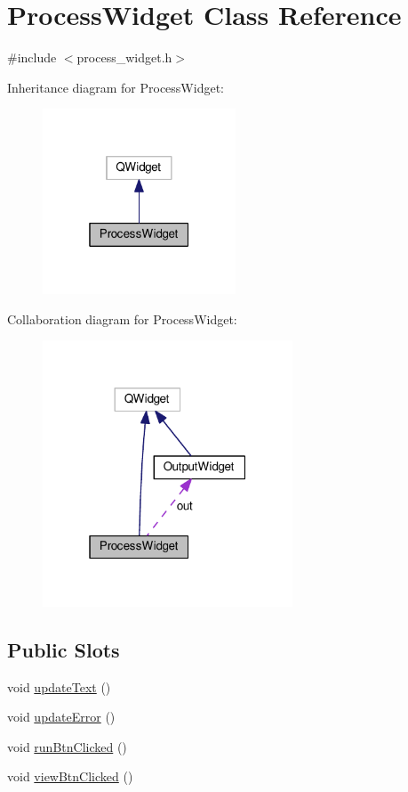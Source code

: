 \hypertarget{classProcessWidget}{}\section{Process\+Widget Class Reference}
\label{classProcessWidget}


{\ttfamily \#include $<$process\+\_\+widget.\+h$>$}



Inheritance diagram for Process\+Widget\+:\nopagebreak
\begin{figure}[H]
\begin{center}
\leavevmode
\includegraphics[width=163pt]{classProcessWidget__inherit__graph}
\end{center}
\end{figure}


Collaboration diagram for Process\+Widget\+:\nopagebreak
\begin{figure}[H]
\begin{center}
\leavevmode
\includegraphics[width=211pt]{classProcessWidget__coll__graph}
\end{center}
\end{figure}
\subsection*{Public Slots}
\begin{DoxyCompactItemize}
\item 
void \hyperlink{classProcessWidget_a56fb109b399232b285cbea288631d18b}{update\+Text} ()
\item 
void \hyperlink{classProcessWidget_aa998c907c732bf27822ae53a8e83850c}{update\+Error} ()
\item 
void \hyperlink{classProcessWidget_afc941023cc434c5de6cc07059245d393}{run\+Btn\+Clicked} ()
\item 
void \hyperlink{classProcessWidget_af03bf5d00a16b15dfeb27d9865dc0b72}{view\+Btn\+Clicked} ()
\end{DoxyCompactItemize}
